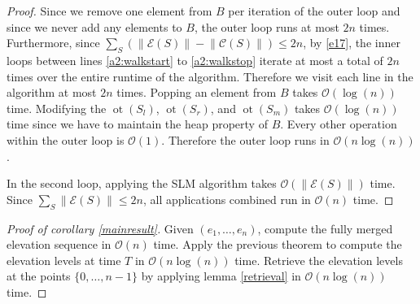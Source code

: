 \documentclass[11pt,a4paper]{article}
\newcommand{\norm}[1]{\left\lVert #1 \right\rVert}
\newcommand{\bO}{\mathcal{O}}
\newcommand{\C}{\mathcal{C}}
\newcommand{\E}{\mathcal{E}}
\DeclareMathOperator{\ot}{ot}
\begin{document}
\begin{proof}
Since we remove one element from $B$ per iteration of the outer loop and since we never add any elements to $B$, the outer loop runs at most $2n$ times.
Furthermore, since $\sum_S\left(\norm{\E(S)} - \norm{\C(S)}\right) \le 2n$, by \ref{e17}, the inner loops between lines \ref{a2:walkstart} to \ref{a2:walkstop} iterate at most a total of $2n$ times over the entire runtime of the algorithm.
Therefore we visit each line in the algorithm at most $2n$ times.
Popping an element from $B$ takes $\bO(\log(n))$ time.
Modifying the $\ot(S_l)$, $\ot(S_r)$, and $\ot(S_m)$ takes $\bO(\log(n))$ time since we have to maintain the heap property of $B$.
Every other operation within the outer loop is $\bO(1)$.
Therefore the outer loop runs in $\bO(n\log(n))$.

In the second loop, applying the SLM algorithm takes $\bO(\norm{\E(S)})$ time.
Since $\sum_S\norm{\E(S)}\le 2n$, all applications combined run in $\bO(n)$ time.
\end{proof}

\begin{proof}[Proof of corollary \ref{mainresult}] 
Given $(e_1,\ldots,e_n)$, compute the fully merged elevation sequence in $\bO(n)$ time.
Apply the previous theorem to compute the elevation levels at time $T$ in $\bO(n\log(n))$ time.
Retrieve the elevation levels at the points $\{0,\ldots,n-1\}$ by applying lemma \ref{retrieval} in $\bO(n\log(n))$ time.
\end{proof}
\end{document}

